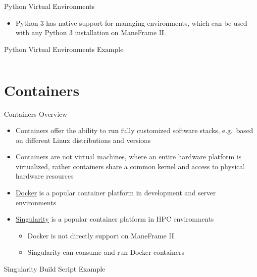\documentclass[aspectratio=169]{beamer}
\begin{document}
\begin{frame}{Python Virtual Environments}
\begin{itemize}
\item Python 3 has native support for managing environments, which can be used
with any Python 3 installation on ManeFrame II.
\end{itemize}
\end{frame}

\begin{frame}{Python Virtual Environments Example}
\begin{listing}[H]
\inputminted[firstline=3,firstnumber=1]{sh}{examples/python_environments.sh}
\caption{A specific installation of Python, in this case from Spack, is used
and then JupyterLab and its dependencies are installed. The new environment is
then loaded and then unloaded.}
\end{listing}
\end{frame}

\section{Containers}

\begin{frame}{Containers Overview}
\begin{itemize}
\item Containers offer the ability to run fully customized software stacks,
e.g.\ based on different Linux distributions and versions
\item Containers are not virtual machines, where an entire hardware platform is
virtualized, rather containers share a common kernel and access to physical
hardware resources
\item \href{https://www.docker.com}{Docker} is a popular container platform in
development and server environments
\item \href{https://sylabs.io}{Singularity} is a popular container platform in
HPC environments
\begin{itemize}
\item Docker is not directly support on ManeFrame II
\item Singularity can consume and run Docker containers
\end{itemize}
\end{itemize}
\end{frame}

\begin{frame}{Singularity Build Script Example}
\begin{listing}[H]
\inputminted{Singularity}{examples/python3.singularity}
\caption{Example Singularity build file that uses Ubuntu 18.04 and Python3 with
package installation via \texttt{apt} and \texttt{pip}.}
\end{listing}
\end{frame}
\end{document}
